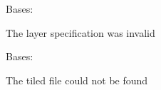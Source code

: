 \documentclass[letterpaper,10pt,english]{sphinxmanual}
\begin{document}
\begin{fulllineitems}
\label{blocks:serge.blocks.tiled.BadLayer}
Bases: 

The layer specification was invalid

\end{fulllineitems}


\begin{fulllineitems}
\label{blocks:serge.blocks.tiled.BadTiledFile}
Bases: 

The tiled file could not be found

\end{fulllineitems}

\end{document}
